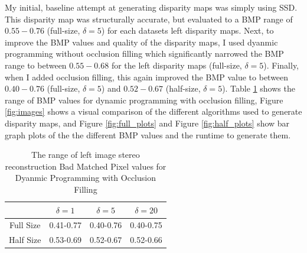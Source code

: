 \documentclass[11pt,a4paper]{article}
\begin{document}
My initial, baseline attempt at generating disparity maps was simply using SSD. This disparity map was structurally accurate, 
 but evaluated to a BMP range of $0.55-0.76$ (full-size, $\delta = 5$) for each datasets left disparity maps. Next, to
 improve the BMP values and quality of the disparity maps, I used dyanmic programming without occlusion filling which significantly narrowed
 the BMP range to between $0.55-0.68$ for the left disparity maps (full-size, $\delta = 5$). Finally, when I added occlusion filling, this again improved the BMP value 
 to between $0.40-0.76$ (full-size, $\delta = 5$) and $0.52-0.67$ (half-size, $\delta = 5$). Table \ref{tab:table1} shows the range of 
 BMP values for dynamic programming with occlusion filling, Figure \ref{fig:images} shows a visual comparison of the different algorithms used to generate
 disparity maps, and Figure \ref{fig:full_plots} and Figure \ref{fig:half_plots} show bar graph plots of the the different BMP values and the runtime to generate them.

 \begin{table}
    \centering
    \begin{tabular}{ |c|c|c|c| } 
     \hline
      & $\delta = 1$ & $\delta = 5$ & $\delta = 20$ \\
     \hline
     Full Size & 0.41-0.77 & 0.40-0.76 & 0.40-0.75\\ 
     \hline
     Half Size & 0.53-0.69 & 0.52-0.67 & 0.52-0.66\\ 
     \hline
    \end{tabular}
    \caption{The range of left image stereo reconstruction Bad Matched Pixel values for Dyanmic Programming with Occlusion Filling}
    \label{tab:table1}
\end{table}
\end{document}
